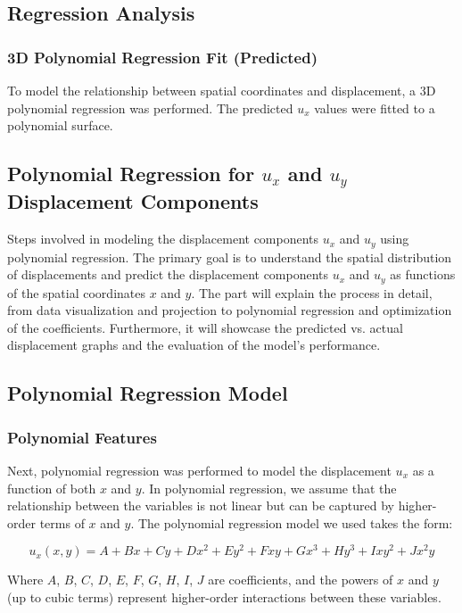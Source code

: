 \documentclass[fleqn,10pt]{olplainarticle}
\begin{document}
\subsection{Regression Analysis}

\subsubsection{3D Polynomial Regression Fit (Predicted)}
To model the relationship between spatial coordinates and displacement, a 3D polynomial regression was performed. The predicted $u_x$ values were fitted to a polynomial surface.


\subsection{Polynomial Regression for $u_x$ and $u_y$ Displacement Components}
Steps involved in modeling the displacement components $u_x$ and $u_y$ using polynomial regression. The primary goal is to understand the spatial distribution of displacements and predict the displacement components $u_x$ and $u_y$ as functions of the spatial coordinates $x$ and $y$. The part will explain the process in detail, from data visualization and projection to polynomial regression and optimization of the coefficients. Furthermore, it will showcase the predicted vs. actual displacement graphs and the evaluation of the model’s performance.

\subsection{Polynomial Regression Model}
\subsubsection{Polynomial Features}
Next, polynomial regression was performed to model the displacement $u_x$ as a function of both $x$ and $y$. In polynomial regression, we assume that the relationship between the variables is not linear but can be captured by higher-order terms of $x$ and $y$. The polynomial regression model we used takes the form:

\[
u_x(x, y) = A + Bx + Cy + Dx^2 + Ey^2 + Fxy + Gx^3 + Hy^3 + Ixy^2 + Jx^2y
\]

Where $A$, $B$, $C$, $D$, $E$, $F$, $G$, $H$, $I$, $J$ are coefficients, and the powers of $x$ and $y$ (up to cubic terms) represent higher-order interactions between these variables.
\end{document}
